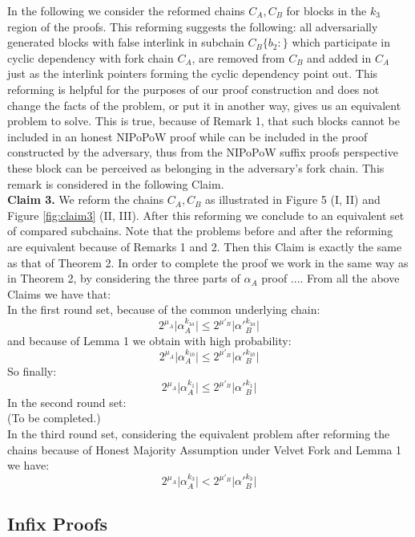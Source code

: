 \documentclass[11pt,a4paper]{article}
\begin{document}
In the following we consider the reformed chains $C_A, C_B$ for blocks in the $k_3$ region of the proofs. This reforming suggests the following: all adversarially generated blocks with false interlink in subchain $C_B\{b_2:\}$ which participate in cyclic dependency with fork chain $C_A$, are removed from $C_B$ and added in $C_A$ just as the interlink pointers forming the cyclic dependency point out. This reforming is helpful for the purposes of our proof construction and does not change the facts of the problem, or put it in another way, gives us an equivalent problem to solve. This is true, because of Remark 1, that such blocks cannot be included in an honest NIPoPoW proof while can be included in the proof constructed by the adversary, thus from the NIPoPoW suffix proofs perspective these block can be perceived as belonging in the adversary's fork chain. This remark is considered in the following Claim.\\
\textbf{Claim 3.} We reform the chains $C_A, C_B$ as illustrated in Figure 5 (I, II) and Figure \ref{fig:claim3} (II, III). After this reforming we conclude to an equivalent set of compared subchains. Note that the problems before and after the reforming are equivalent because of Remarks 1 and 2. Then this Claim is exactly the same as that of Theorem 2.
In order to complete the proof we work in the same way as in Theorem 2, by considering the three parts of $\alpha_A$ proof ....
From all the above Claims we have that:\\
In the first round set, because of the common underlying chain:
\begin{equation*}
2^{\mu_A} \vert \alpha_A^{k_{1a}} \vert \leq 2^{\mu'_B} \vert \alpha'{_B^{k_{1a}}} \vert
\end{equation*}
and because of Lemma 1 we obtain with high probability:
\begin{equation*} 
2^{\mu_A} \vert \alpha_A^{k_{1b}} \vert \leq 2^{\mu'_B} \vert \alpha'{_B^{k_{1b}}} \vert
\end{equation*}
So finally:
\begin{equation} \label{eq_v_round_set_1}
2^{\mu_A} \vert \alpha_A^{k_1} \vert \leq 2^{\mu'_B} \vert \alpha'{_B^{k_1}} \vert
\end{equation}
In the second round set:\\
(To be completed.)\\
In the third round set, considering the equivalent problem after reforming the chains because of Honest Majority Assumption under Velvet Fork and Lemma 1 we have:
\begin{equation} \label{eq_v_round_set_3}
2^{\mu_A} \vert \alpha_A^{k_3} \vert < 2^{\mu'_B} \vert \alpha'{_B^{k_3}} \vert
\end{equation}

\subsection{Infix Proofs}

\end{document}
